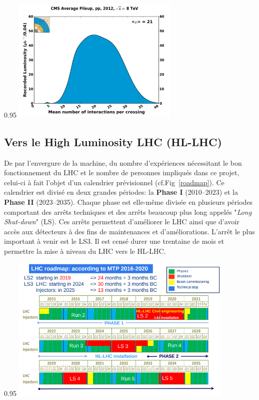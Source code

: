 \begin{minipagewithmarginpars}[ht!]{0.95\textwidth}
	\centering
	\includegraphics[width=0.60\textwidth]{LHC/pileup.png}
	\label{pile-up}	
\end{minipagewithmarginpars}

\subsection{Vers le High Luminosity LHC (HL-LHC)}
De par l'envergure de la machine, du nombre d'expériences nécessitant le bon fonctionnement du LHC et le nombre de personnes impliqués dans ce projet, celui-ci à fait l'objet d'un calendrier prévisionnel (cf.Fig~\ref{roadmap}). Ce calendrier est divisé en deux grandes périodes: la \textbf{Phase I} (\num{2010}--\num{2023}) et la  \textbf{Phase II} (\num{2023}--\num{2035}). Chaque phase est elle-même divisée en plusieurs périodes comportant des arrêts techniques et des arrêts beaucoup plus long appelés "\textit{Long Shut-down}" (LS). Ces arrêts permettent d'améliorer le LHC ainsi que d'avoir accès aux détecteurs à des fins de maintenances et d'améliorations. L'arrêt le plus important à venir est le LS3. Il est censé durer une trentaine de mois et permettre la mise à niveau du LHC vers le HL-LHC.

\begin{minipagewithmarginpars}[ht!]{0.95\textwidth}
	\centering
	\includegraphics[width=0.80\textwidth]{LHC/roadmap.png}
	\label{roadmap}	
\end{minipagewithmarginpars}

